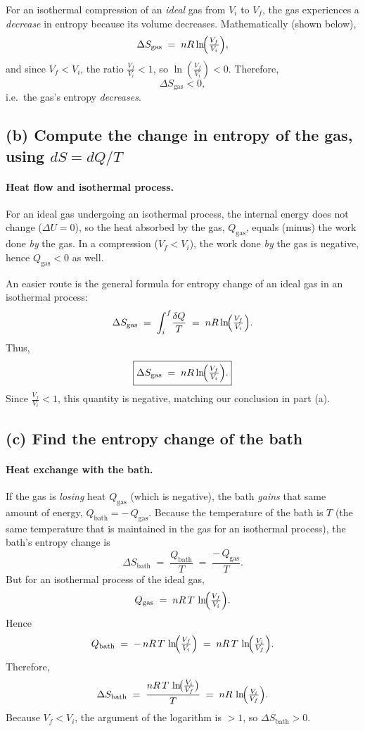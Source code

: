 \documentclass[12pt]{article}
\theoremstyle{definition} %
\theoremstyle{plain} %
\begin{document}
For an isothermal compression of an \emph{ideal} gas from $V_i$ to $V_f$, the gas experiences a \emph{decrease} in entropy because its volume decreases. 
Mathematically (shown below), 
\[
\Delta S_{\text{gas}} \;=\; nR \ln\!\Bigl(\tfrac{V_f}{V_i}\Bigr),
\]
and since $V_f<V_i$, the ratio $\tfrac{V_f}{V_i}<1$, so $\ln(\tfrac{V_f}{V_i})<0$. 
Therefore, 
\[
\Delta S_{\text{gas}} < 0,
\]
i.e.\ the gas's entropy \emph{decreases}.

\subsection*{(b) Compute the change in entropy of the gas, using \texorpdfstring{$dS = dQ/T$}{dS = dQ/T}}

\paragraph{Heat flow and isothermal process.}
For an ideal gas undergoing an isothermal process,
the internal energy does not change ($\Delta U=0$),
so the heat absorbed by the gas, $Q_{\text{gas}}$, equals (minus) the work done \emph{by} the gas.
In a compression ($V_f < V_i$), the work done \emph{by} the gas is negative, hence $Q_{\text{gas}}<0$ as well.

An easier route is the general formula for entropy change of an ideal gas in an isothermal process:
\[
\Delta S_{\text{gas}}
\;=\;
\int_{i}^{f}\! \frac{\delta Q}{T}
\;=\;
nR \ln\!\Bigl(\tfrac{V_f}{V_i}\Bigr).
\]
Thus,
\[
\boxed{
\Delta S_{\text{gas}}
\;=\;
nR \ln\!\Bigl(\tfrac{V_f}{V_i}\Bigr).
}
\]
Since $\tfrac{V_f}{V_i}<1$, this quantity is negative, matching our conclusion in part (a).

\subsection*{(c) Find the entropy change of the bath}

\paragraph{Heat exchange with the bath.}
If the gas is \emph{losing} heat $Q_{\text{gas}}$ (which is negative), 
the bath \emph{gains} that same amount of energy, $Q_{\text{bath}} = -\,Q_{\text{gas}}$. 
Because the temperature of the bath is $T$ (the same temperature that is maintained in the gas for an isothermal process), 
the bath's entropy change is
\[
\Delta S_{\text{bath}}
\;=\;
\frac{Q_{\text{bath}}}{T}
\;=\;
\frac{-\,Q_{\text{gas}}}{T}.
\]
But for an isothermal process of the ideal gas,
\[
Q_{\text{gas}}
\;=\;
nR\,T\,\ln\!\Bigl(\tfrac{V_f}{V_i}\Bigr).
\]
Hence
\[
Q_{\text{bath}}
\;=\;
-\,nR\,T\,\ln\!\Bigl(\tfrac{V_f}{V_i}\Bigr)
\;=\;
nR\,T\,\ln\!\Bigl(\tfrac{V_i}{V_f}\Bigr).
\]
Therefore,
\[
\Delta S_{\text{bath}}
\;=\;
\frac{nR\,T\,\ln\!\bigl(\tfrac{V_i}{V_f}\bigr)}{T}
\;=\;
nR\,\ln\!\Bigl(\tfrac{V_i}{V_f}\Bigr).
\]
Because $V_f<V_i$, the argument of the logarithm is $>1$, so $\Delta S_{\text{bath}}>0$.
\end{document}
